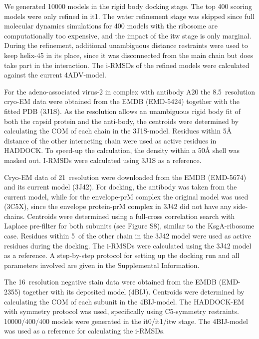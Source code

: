We generated 10000 models in the rigid body docking stage.  The top 400 scoring
models were only refined in it1.  The water refinement stage was skipped since
full molecular dynamics simulations for 400 models with the ribosome are
computationally too expensive, and the impact of the itw stage is only
marginal.  During the refinement, additional unambiguous distance restraints
were used to keep helix-45 in its place, since it was disconnected from the
main chain but does take part in the interaction.  The i-RMSDs of the refined
models were calculated against the current 4ADV-model.


For the adeno-associated virus-2 in complex with antibody A20 the 8.5\Angstrom\
resolution cryo-EM data were obtained from the EMDB (EMD-5424) together with
the fitted PDB (3J1S).  As the resolution allows an unambiguous rigid body fit
of both the capsid protein and the anti-body, the centroids were determined by
calculating the COM of each chain in the 3J1S-model.  Residues within 5Å
distance of the other interacting chain were used as active residues in
HADDOCK.  To speed-up the calculation, the density within a 50Å shell was
masked out.  I-RMSDs were calculated using 3J1S as a reference. 


Cryo-EM data of 21\Angstrom\ resolution were downloaded from the EMDB (EMD-5674) and its
current model (3J42).  For docking, the antibody was taken from the current
model, while for the envelope-prM complex the original model was used (3C5X),
since the envelope protein-prM complex in 3J42 did not have any side-chains.
Centroids were determined using a full-cross correlation search with Laplace
pre-filter for both subunits (see Figure S8), similar to the KsgA-ribosome
case.  Residues within 5\Angstrom\ of the other chain in the 3J42 model were used as
active residues during the docking.  The i-RMSDs were calculated using the 3J42
model as a reference.  A step-by-step protocol for setting up the docking run
and all parameters involved are given in the Supplemental Information.


The 16\Angstrom\ resolution negative stain data were obtained from the EMDB (EMD-2355)
together with its deposited model (4BIJ).  Centroids were determined by
calculating the COM of each subunit in the 4BIJ-model.  The HADDOCK-EM with
symmetry protocol was used, specifically using C5-symmetry restraints.
10000/400/400 models were generated in the it0/it1/itw stage.  The 4BIJ-model
was used as a reference for calculating the i-RMSDs. 

